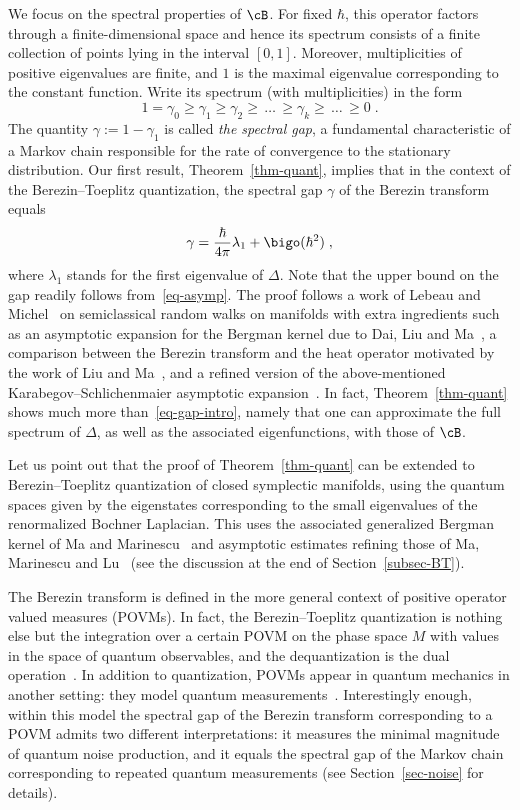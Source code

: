 We focus on the spectral properties of $\cB$. For fixed $\hbar$, this operator factors through a finite-dimensional space and hence its spectrum consists of a finite collection of points lying in the interval $[0,1]$. Moreover, multiplicities of positive eigenvalues are finite, and $1$ is the maximal eigenvalue corresponding to the constant function. Write its spectrum (with multiplicities) in the form
\[
1=\gamma_0
\geq \gamma_1 \geq \gamma_2\geq\,\dots\, \geq \gamma_k \geq\,\dots\,\geq 0\;.
\]
The quantity $\gamma:= 1-\gamma_1$ is called \emph{the spectral gap}, a fundamental characteristic of a Markov chain responsible for the rate of convergence to the stationary distribution. Our first result, Theorem~\ref{thm-quant}, implies that in the context of the Berezin--Toeplitz quantization, the spectral gap $\gamma$ of the Berezin transform equals
\begin{equation}\label{eq-gap-intro}
\gamma = \frac{\hbar}{4\pi}\lambda_1 + \bigo(\hbar^2)\;,
\end{equation}
where $\lambda_1$ stands for the first eigenvalue of $\Delta$. Note that the upper bound on the gap readily follows from~\eqref{eq-asymp}. The proof follows a work of Lebeau and Michel~\cite{LM} on semiclassical random walks on manifolds with extra ingredients such as an asymptotic expansion for the Bergman kernel due to Dai, Liu and Ma~\cite{DLM06}, a comparison between the Berezin transform and the heat operator motivated by the work of Liu and Ma~\cite{LM07}, and a refined version of the above-mentioned Karabegov--Schlichenmaier asymptotic expansion~\cite{KS01}. In fact, Theorem~\ref{thm-quant} shows much more than~\eqref{eq-gap-intro}, namely that one can approximate the full spectrum of $\Delta$, as well as the associated eigenfunctions, with those of $\cB$.

Let us point out that the proof of Theorem~\ref{thm-quant} can be extended to Berezin--Toeplitz quantization of closed symplectic manifolds, using the quantum spaces given by the eigenstates corresponding to the small eigenvalues of the renormalized Bochner Laplacian. This uses the associated generalized Bergman kernel of Ma and Marinescu~\cite{MM08} and asymptotic estimates refining those of Ma, Marinescu and Lu~\cite{LMM16} (see the discussion at the end of Section~\ref{subsec-BT}).


The Berezin transform is defined in the more general context of positive operator valued measures (POVMs). In fact, the Berezin--Toeplitz quantization is nothing else but the integration over a certain POVM on the phase space $M$ with values in the space of quantum observables, and the dequantization is the dual operation~\cite{CP,La}. In addition to quantization, POVMs appear in quantum mechanics in another setting: they model quantum measurements~\cite{Busch-2}. Interestingly enough, within this model the spectral gap of the Berezin transform corresponding to a POVM admits two different interpretations: it measures the minimal magnitude of quantum noise production, and it equals the spectral gap of the Markov chain corresponding to repeated quantum measurements (see Section~\ref{sec-noise} for details).

